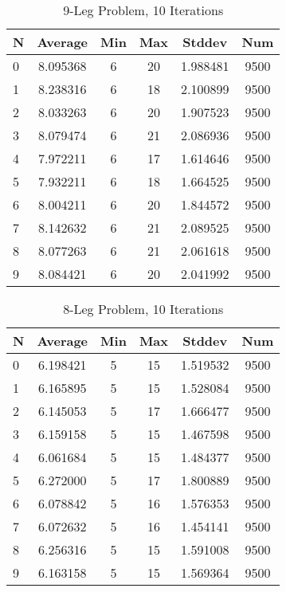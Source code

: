 \documentclass{article}
\begin{document}
\begin{table}
\centering
\begin{tabular}{|l|c|c|c|c|c|}
\hline
N & Average & Min & Max & Stddev & Num \\
\hline
0 & 8.095368 & 6 & 20 & 1.988481 & 9500 \\ 
1 & 8.238316 & 6 & 18 & 2.100899 & 9500 \\ 
2 & 8.033263 & 6 & 20 & 1.907523 & 9500 \\ 
3 & 8.079474 & 6 & 21 & 2.086936 & 9500 \\ 
4 & 7.972211 & 6 & 17 & 1.614646 & 9500 \\ 
5 & 7.932211 & 6 & 18 & 1.664525 & 9500 \\ 
6 & 8.004211 & 6 & 20 & 1.844572 & 9500 \\ 
7 & 8.142632 & 6 & 21 & 2.089525 & 9500 \\ 
8 & 8.077263 & 6 & 21 & 2.061618 & 9500 \\ 
9 & 8.084421 & 6 & 20 & 2.041992 & 9500 \\ 
\hline
\end{tabular}
\caption{9-Leg Problem, 10 Iterations}
\label{tab:template}
\end{table}

\begin{table}
\centering
\begin{tabular}{|l|c|c|c|c|c|}
\hline
N & Average & Min & Max & Stddev & Num \\
\hline
0 & 6.198421 & 5 & 15 & 1.519532 & 9500 \\ 
1 & 6.165895 & 5 & 15 & 1.528084 & 9500 \\ 
2 & 6.145053 & 5 & 17 & 1.666477 & 9500 \\ 
3 & 6.159158 & 5 & 15 & 1.467598 & 9500 \\ 
4 & 6.061684 & 5 & 15 & 1.484377 & 9500 \\ 
5 & 6.272000 & 5 & 17 & 1.800889 & 9500 \\ 
6 & 6.078842 & 5 & 16 & 1.576353 & 9500 \\ 
7 & 6.072632 & 5 & 16 & 1.454141 & 9500 \\ 
8 & 6.256316 & 5 & 15 & 1.591008 & 9500 \\ 
9 & 6.163158 & 5 & 15 & 1.569364 & 9500 \\
\hline
\end{tabular}
\caption{8-Leg Problem, 10 Iterations}
\label{tab:template}
\end{table}
\end{document}
